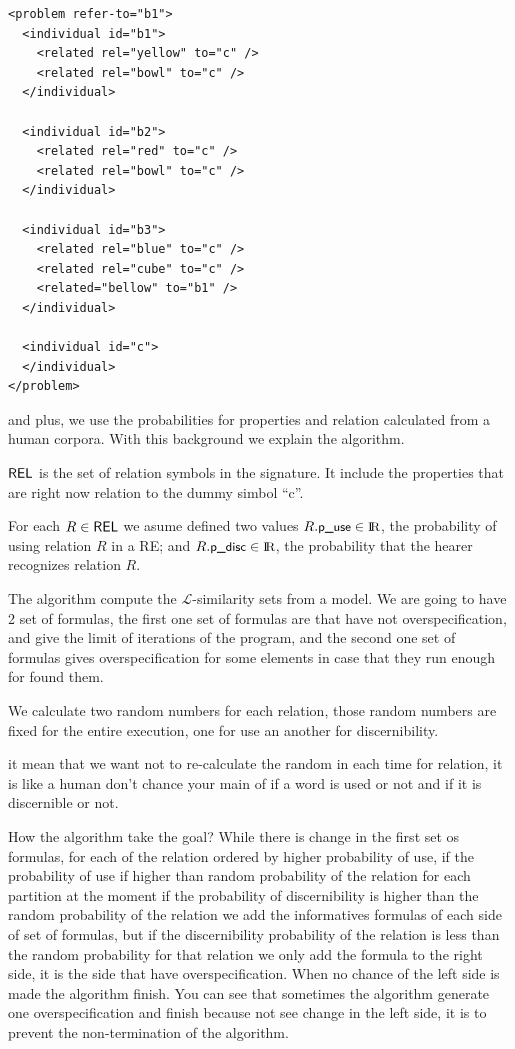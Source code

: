 \begin{verbatim}
<problem refer-to="b1">
  <individual id="b1">
    <related rel="yellow" to="c" />
    <related rel="bowl" to="c" />
  </individual>

  <individual id="b2">
    <related rel="red" to="c" />
    <related rel="bowl" to="c" />
  </individual>

  <individual id="b3">
    <related rel="blue" to="c" />
    <related rel="cube" to="c" />
    <related="bellow" to="b1" />
  </individual>
  
  <individual id="c">
  </individual>
</problem>
\end{verbatim}

and plus, we use the probabilities for properties and relation calculated from a human corpora.
With this background we explain the algorithm.

$\textsf{REL}$ is the set of relation symbols in the signature. It include the properties that are right now relation to the dummy simbol ``c''. 

For each $R \in \textsf{REL}$ we asume defined two values $R.\small \textsf{p\_use} \in \textrm{I}\!\textrm{R}$, the 
probability of using relation $R$ in a RE; and $R.\small \textsf{p\_disc} \in \textrm{I}\!\textrm{R}$, the 
probability that the hearer recognizes relation $R$. 

The algorithm compute the $\mathcal{L}$-similarity sets from a model. 
We are going to have 2 set of formulas, the first one set of formulas are that have not overspecification, and give the limit of iterations of the program, and the second one set of formulas gives overspecification for some elements in case that they run enough for found them.

We calculate two random numbers for each relation, those random numbers are fixed for the entire execution, one for use an another for discernibility. 

it mean that we want not to re-calculate the random in each time for relation, it is like a human don't chance your main of if a word is used or not and if it is discernible or not.

How the algorithm take the goal?
While there is change in the first set os formulas, for each of the relation ordered by higher probability of use, if the probability of use if higher than random probability of the relation for each partition at the moment if the probability of discernibility is higher than the random probability of the relation we add the informatives formulas of each side of set of formulas, but if the discernibility probability of the relation is less than the random probability for that relation we only add the formula to the right side, it is the side that have overspecification.
When no chance of the left side is made the algorithm finish. You can see that sometimes the algorithm generate one overspecification and finish because not see change in the left side, it is to prevent the non-termination of the algorithm.



